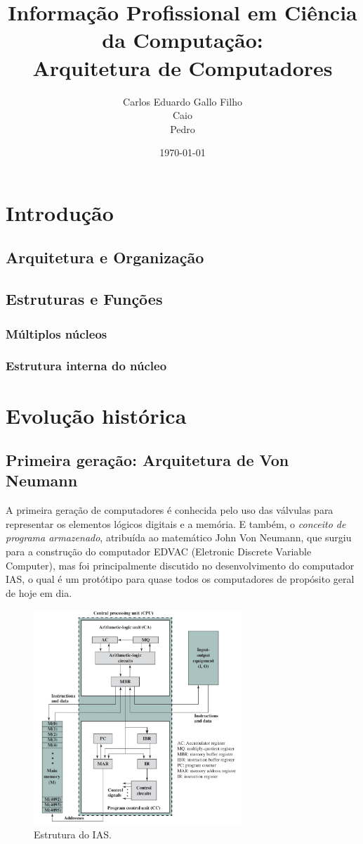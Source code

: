 \documentclass{article}
\title{Informação Profissional em Ciência da Computação:\\
       Arquitetura de Computadores}
\author{Carlos Eduardo Gallo Filho \\
        Caio \\
        Pedro}
\date{\today}
\begin{document}
\maketitle

\section{Introdução}
\subsection{Arquitetura e Organização}
\subsection{Estruturas e Funções}
\subsubsection{Múltiplos núcleos}
\subsubsection{Estrutura interna do núcleo}

\section{Evolução histórica}
\subsection{Primeira geração: Arquitetura de Von Neumann}
A primeira geração de computadores é conhecida pelo uso das válvulas para
representar os elementos lógicos digitais e a memória. E também, o
\textit{conceito de programa armazenado}, atribuída ao matemático John Von
Neumann, que surgiu para a construção do computador EDVAC (Eletronic Discrete
Variable Computer), mas foi principalmente discutido no desenvolvimento do
computador IAS, o qual é um protótipo para quase todos os computadores de
propósito geral de hoje em dia.

\begin{figure}[h]
    \centering
    \includegraphics[width=0.7\textwidth]{ias.png}
    \caption{Estrutura do IAS.}
\end{figure}
\end{document}
